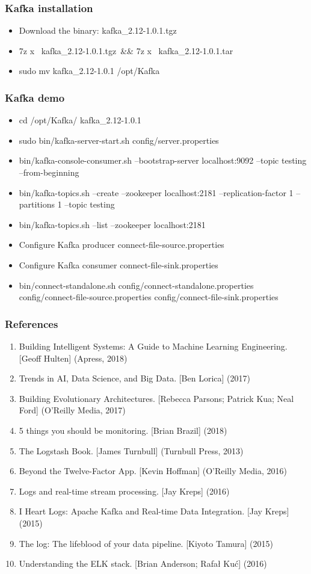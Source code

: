 \documentclass[11pt]{beamer}
\begin{document}
\begin{frame}
\frametitle{Kafka installation}
\begin{itemize}
\item Download the binary: kafka\_2.12-1.0.1.tgz 
\item 7z x  kafka\_2.12-1.0.1.tgz \&\& 7z x  kafka\_2.12-1.0.1.tar
\item sudo mv kafka\_2.12-1.0.1 /opt/Kafka
\end{itemize}
\end{frame}

\begin{frame}
\frametitle{Kafka demo}
\begin{itemize}
\item cd /opt/Kafka/ kafka\_2.12-1.0.1
\item sudo bin/kafka-server-start.sh config/server.properties
\item bin/kafka-console-consumer.sh --bootstrap-server localhost:9092 --topic testing --from-beginning
\item bin/kafka-topics.sh --create --zookeeper localhost:2181 --replication-factor 1 --partitions 1 --topic testing
\item bin/kafka-topics.sh --list --zookeeper localhost:2181
\item Configure Kafka producer connect-file-source.properties
\item Configure Kafka consumer connect-file-sink.properties
\item bin/connect-standalone.sh config/connect-standalone.properties config/connect-file-source.properties config/connect-file-sink.properties
\end{itemize}
\end{frame}


\begin{frame}
\frametitle{References}
\begin{enumerate}
\item Building Intelligent Systems: A Guide to Machine Learning Engineering. [Geoff Hulten] (Apress, 2018)
\item Trends in AI, Data Science, and Big Data. [Ben Lorica] (2017)
\item Building Evolutionary Architectures. [Rebecca Parsons; Patrick Kua; Neal Ford] (O'Reilly Media, 2017)
\item 5 things you should be monitoring. [Brian Brazil] (2018)
\item The Logstash Book. [James Turnbull] (Turnbull Press, 2013)
\item Beyond the Twelve-Factor App. [Kevin Hoffman] (O'Reilly Media, 2016)
\item Logs and real-time stream processing. [Jay Kreps] (2016)
\item I Heart Logs: Apache Kafka and Real-time Data Integration. [Jay Kreps] (2015)
\item The log: The lifeblood of your data pipeline. [Kiyoto Tamura] (2015)
\item Understanding the ELK stack. [Brian Anderson; Rafał Kuć] (2016)
\end{enumerate}
\end{frame}
\end{document}
